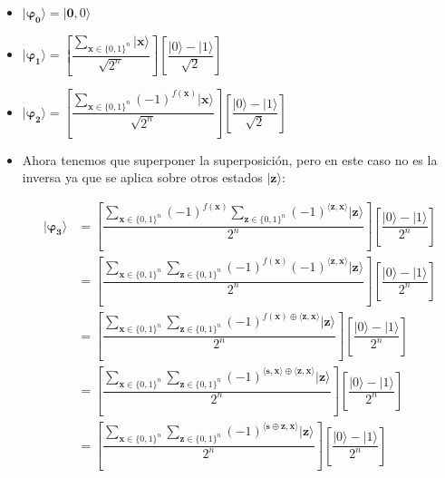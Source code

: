 \begin{itemize}
     \item $\mathbf{|\varphi_{0}\rangle} = |\mathbf{0},0\rangle$

    \vspace{5pt}

    \item  $\mathbf{|\varphi_{1}\rangle} = \left[ \dfrac{\sum_{\mathbf{x} \in \{0,1\}^{n}}|\mathbf{x}\rangle}{\sqrt{2^{n}}}\right] \left[ \dfrac{|0\rangle - |1\rangle}{\sqrt{2}}\right]$

    \vspace{5pt}

    \item $\mathbf{|\varphi_{2}\rangle} =\left[ \dfrac{\sum_{\mathbf{x} \in \{0,1\}^{n}}(-1)^{f(\mathbf{x})}|\mathbf{x}\rangle}{\sqrt{2^{n}}}\right] \left[ \dfrac{|0\rangle - |1\rangle}{\sqrt{2}}\right]$

    \vspace{5pt}

    \item Ahora tenemos que superponer la superposición, pero en este caso no es la inversa ya que se aplica sobre otros estados $|\mathbf{z}\rangle$:

    \begin{equation}
        \begin{split}\mathbf{|\varphi_{3}\rangle} &= \left[ \dfrac{\sum_{\mathbf{x} \in \{0,1\}^{n}}(-1)^{f(\mathbf{x})}\sum_{\mathbf{z} \in \{0,1\}^{n}}(-1)^{\langle\mathbf{z},\mathbf{x}\rangle}|\mathbf{z}\rangle}{2^{n}}\right] \left[ \dfrac{|0\rangle - |1\rangle}{2^{n}}\right] \\ &= \left[ \dfrac{\sum_{\mathbf{x} \in \{0,1\}^{n}}\sum_{\mathbf{z} \in \{0,1\}^{n}}(-1)^{f(\mathbf{x})}(-1)^{\langle\mathbf{z},\mathbf{x}\rangle}|\mathbf{z}\rangle}{2^{n}}\right] \left[ \dfrac{|0\rangle - |1\rangle}{2^{n}}\right] \\ &= \left[ \dfrac{\sum_{\mathbf{x} \in \{0,1\}^{n}}\sum_{\mathbf{z} \in \{0,1\}^{n}}(-1)^{f(\mathbf{x})\oplus\langle\mathbf{z},\mathbf{x}\rangle}|\mathbf{z}\rangle}{2^{n}}\right] \left[ \dfrac{|0\rangle - |1\rangle}{2^{n}}\right] \\  &= \left[ \dfrac{\sum_{\mathbf{x} \in \{0,1\}^{n}}\sum_{\mathbf{z} \in \{0,1\}^{n}}(-1)^{\langle\mathbf{s},\mathbf{x}\rangle\oplus\langle\mathbf{z},\mathbf{x}\rangle}|\mathbf{z}\rangle}{2^{n}}\right] \left[ \dfrac{|0\rangle - |1\rangle}{2^{n}}\right] \\ &= \left[ \dfrac{\sum_{\mathbf{x} \in \{0,1\}^{n}}\sum_{\mathbf{z} \in \{0,1\}^{n}}(-1)^{\langle\mathbf{s}\oplus \mathbf{z},\mathbf{x}\rangle}|\mathbf{z}\rangle}{2^{n}}\right] \left[ \dfrac{|0\rangle - |1\rangle}{2^{n}}\right] \\
        \end{split}
    \end{equation}
 \end{itemize}

